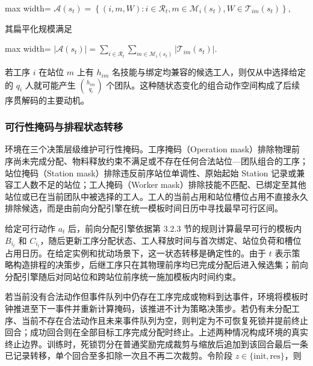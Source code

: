 \documentclass[journal,10pt]{IEEEtran}
\begin{document}
\begin{center}
\begin{adjustbox}{max width=\columnwidth}
$\displaystyle
\mathcal{A}(s_t)=
\left\{(i,m,W):
i\in\mathcal{R}_t,
m\in\mathcal{M}_i(s_t),
W\in\mathcal{T}_{im}(s_t)
\right\},
$
\end{adjustbox}
\end{center}

其扁平化规模满足

\begin{center}
\begin{adjustbox}{max width=\columnwidth}
$\displaystyle
|\mathcal{A}(s_t)|=
\sum_{i\in\mathcal{R}_t}
\sum_{m\in\mathcal{M}_i(s_t)}
|\mathcal{T}_{im}(s_t)|.
$
\end{adjustbox}
\end{center}

若工序 \(i\) 在站位 \(m\) 上有 \(h_{im}\) 名技能与绑定均兼容的候选工人，则仅从中选择给定的 \(q_i\) 人就可能产生 \(\binom{h_{im}}{q_i}\) 个团队。这种随状态变化的组合动作空间构成了后续序贯解码的主要动机。

\subsubsection{可行性掩码与排程状态转移}\label{ux53efux884cux6027ux63a9ux7801ux4e0eux6392ux7a0bux72b6ux6001ux8f6cux79fb}

环境在三个决策层级维护可行性掩码。工序掩码（Operation mask）排除物理前序尚未完成分配、物料释放约束不满足或不存在任何合法站位---团队组合的工序；站位掩码（Station mask）排除违反前序站位单调性、原始起始 Station 记录或兼容工人数不足的站位；工人掩码（Worker mask）排除技能不匹配、已绑定至其他站位或已在当前团队中被选择的工人。工人的当前占用和站位槽位占用不直接永久排除候选，而是由前向分配引擎在统一模板时间日历中寻找最早可行区间。

给定可行动作 \(a_t\) 后，前向分配引擎依据第 3.2.3 节的规则计算最早可行的模板内 \(B_{i_t}\) 和 \(C_{i_t}\)，随后更新工序分配状态、工人释放时间与首次绑定、站位负荷和槽位占用日历。在给定实例和扰动场景下，这一状态转移是确定性的。由于 \(t\) 表示策略构造排程的决策步，后继工序只在其物理前序均已完成分配后进入候选集；前向分配引擎随后对同站位和跨站位前序统一施加模板内时间约束。

若当前没有合法动作但事件队列中仍存在工序完成或物料到达事件，环境将模板时钟推进至下一事件并重新计算掩码，该推进不计为策略决策步。若仍有未分配工序、当前不存在合法动作且未来事件队列为空，则判定为不可恢复死锁并提前终止回合；成功回合则在全部目标工序完成分配时终止。上述两种情况构成环境的真实终止边界。训练时，死锁罚分在普通奖励完成裁剪与缩放后追加到该回合最后一条已记录转移，单个回合至多扣除一次且不再二次裁剪。令阶段 \(z\in\lbrace{}\mathrm{init},\mathrm{res}\rbrace{}\)，则
\end{document}
